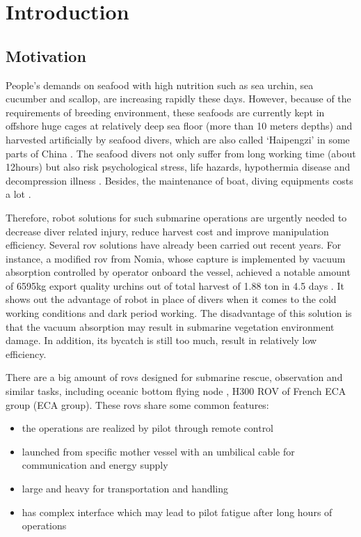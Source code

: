 \section{Introduction}

\subsection{Motivation}

People's demands on seafood with high nutrition such as sea urchin, sea cucumber
and scallop, are increasing rapidly these days. However, because of the
requirements of breeding environment, these seafoods are currently kept in
offshore huge cages at relatively deep sea floor (more than 10 meters depths)
and harvested artificially by seafood divers, which are also called `Haipengzi'
in some parts of China \parencite{hpz}. The seafood divers not only suffer from
long working time (about 12hours) but also risk psychological stress, life
hazards, hypothermia disease and decompression illness
\parencite{barratt2002decompression}. Besides, the maintenance of boat, diving
equipments costs a lot \parencite{divervd}.

Therefore, robot solutions for such submarine operations are urgently needed to
decrease diver related injury, reduce harvest cost and improve manipulation
efficiency. Several \gls{rov} solutions have already been carried out recent
years. For instance, a modified \gls{rov} from Nomia, whose capture is
implemented by vacuum absorption controlled by operator onboard the vessel,
achieved a notable amount of 6595kg export quality urchins out of total harvest
of 1.88 ton in 4.5 days \parencite{james2012test}. It shows out the advantage of
robot in place of divers when it comes to the cold working conditions and dark
period working. The disadvantage of this solution is that the vacuum absorption
may result in submarine vegetation environment damage. In addition, its bycatch
is still too much, result in relatively low efficiency.

There are a big amount of \gls{rov}s designed for submarine rescue, observation
and similar tasks, including oceanic bottom flying node
\parencite{qin2019distributed}, H300 ROV of French ECA group (ECA group). These
\gls{rov}s share some common features:
\begin{itemize}
    \item the operations are realized by pilot through remote control
    \item launched from specific mother vessel with an umbilical cable for
    communication and energy supply
    \item large and heavy for transportation and handling
    \item has complex interface which may lead to pilot fatigue after long hours
    of operations \parencite{6003619}
\end{itemize}

